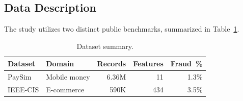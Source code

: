 \documentclass[10pt,a4paper,twocolumn]{article}
\begin{document}
\subsection{Data Description}
The study utilizes two distinct public benchmarks, summarized in Table~\ref{tab:data}.

\begin{table}[H]
\centering
\caption{Dataset summary.}
\label{tab:data}
{\small
\begin{tabularx}{\columnwidth}{@{}lXrrr@{}}
\toprule
\textbf{Dataset} & \textbf{Domain} & \textbf{Records} & \textbf{Features} & \textbf{Fraud~\%} \\
\midrule
PaySim   & Mobile money    & 6.36M & 11  & 1.3\% \\
IEEE-CIS & E-commerce      & 590K  & 434 & 3.5\% \\
\bottomrule
\end{tabularx}
}
\end{table}
\end{document}
